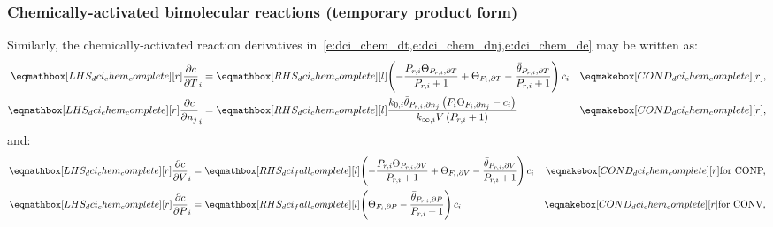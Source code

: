 \documentclass[12pt]{article}
\newcommand{\conp}{CONP}
\newcommand{\conv}{CONV}
\newcommand{\dconp}{\ifmmode\text{for \conp,}\else for \conp,\fi}
\newcommand{\dconv}{\ifmmode\text{for \conv,}\else for \conv.\fi}
\begin{document}
\subsubsection{Chemically-activated bimolecular reactions (temporary product form)}
Similarly, the chemically-activated reaction derivatives in~\cref{e:dci_chem_dt,e:dci_chem_dnj,e:dci_chem_de} may be written as:
\begin{align}
\lhs{dci_chem_complete}{\frac{\partial c }{\partial T }_{i}} &= \rhs{dci_chem_complete}{\left(- \frac{P_{r, i} \Theta_{P_{r,i}, \partial T}}{P_{r, i} + 1} + \Theta_{F_i, \partial T} - \frac{\bar{\theta}_{P_{r, i}, \partial T}}{P_{r, i} + 1}\right) c_{i}} & \cond{dci_chem_complete}{,} \\
\lhs{dci_chem_complete}{\frac{\partial c }{\partial {n_j} }_{i}} &= \rhs{dci_chem_complete}{\frac{k_{0, i} \bar{\theta}_{P_{r, i}, \partial n_j} \left(F_{i} \Theta_{F_i, \partial n_j} - c_{i}\right)}{k_{\infty, i} V \left(P_{r, i} + 1\right)}} & \cond{dci_chem_complete}{,}
\end{align}
and:
\begin{subequations}
 \begin{align}
  \lhs{dci_chem_complete}{\frac{\partial c }{\partial V }_{i}} &= \rhs{dci_fall_complete}{\left(- \frac{P_{r, i} \Theta_{P_{r,i}, \partial V}}{P_{r, i} + 1} + \Theta_{F_i, \partial V} - \frac{\bar{\theta}_{P_{r, i}, \partial V}}{P_{r, i} + 1}\right) c_{i}} & \cond{dci_chem_complete}{\dconp} \\
  \lhs{dci_chem_complete}{\frac{\partial c }{\partial P }_{i}} &= \rhs{dci_fall_complete}{\left(\Theta_{F_i, \partial P} - \frac{\bar{\theta}_{P_{r, i}, \partial P}}{P_{r, i} + 1}\right) c_{i}} & \cond{dci_chem_complete}{\dconv}
 \end{align}
\end{subequations}

\printbibliography
\end{document}
